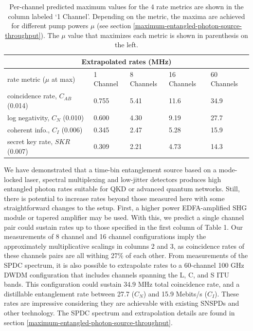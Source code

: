 \documentclass[11pt]{caltech_thesis} %
\begin{document}
\begin{table}
\begin{tabular}{ |p{3.5cm}||p{2.5cm}|p{2.5cm}|p{2.5cm}|p{2.5cm}|}
 \hline
 \multicolumn{5}{|c|}{Extrapolated rates (MHz)} \\
 \hline
 \makecell[l]{rate metric \\ ($\mu$ at max)}   &  1 Channel & 8 Channels & 16 Channels & 60 Channels \label{table:max_rates}\\
 \hline
 \makecell[l]{coincidence rate, $C_{AB}$ \\(0.014)} & 0.755 & 5.41    &  11.6  &  34.9     \\
 \hline
 \makecell[l]{log negativity, $C_N$ \\(0.010)}& 0.600 & 4.30    &  9.19  &  27.7   \\
 \hline
 \makecell[l]{coherent info., $C_I$ \\(0.006)}& 0.345 & 2.47 &  5.28  &  15.9 \\
 \hline
 \makecell[l]{secret key rate, $SKR$ \\(0.007)}& 0.309 & 2.21 &  4.73  &  14.3 \\
 \hline
\end{tabular}
\caption[{Extrapolating entanglement rates to more channels}]{Per-channel predicted maximum values for the 4 rate metrics are shown in the column labeled `1 Channel'. Depending on the metric, the maxima are achieved for different pump powers $\mu$ (see section \ref{maximum-entangled-photon-source-throughput}). The $\mu$ value that maximizes each metric is shown in parenthesis on the left.}
\label{table:maximum_rates}
\end{table}

We have demonstrated that a time-bin entanglement source based on a mode-locked laser, spectral multiplexing and low-jitter detectors produces high entangled photon rates suitable for QKD or advanced quantum networks. Still, there is potential to increase rates beyond those measured here with some straightforward changes to the setup. First, a higher power EDFA-amplified SHG module or tapered amplifier may be used. With this, we predict a single channel pair could sustain rates up to those specified in the first column of Table 1. Our measurements of 8 channel and 16 channel configurations imply the approximately multiplicative scalings in columns 2 and 3, as coincidence rates of these channels pairs are all withing 27\% of each other. From measurements of the SPDC spectrum, it is also possible to extrapolate rates to a 60-channel 100 GHz DWDM configuration that includes channels spanning the L, C, and S ITU bands. This configuration could sustain 34.9 MHz total coincidence rate, and a distillable entanglement rate between 27.7 ($C_N$) and 15.9 Mebits/s ($C_I$). These rates are impressive considering they are achievable with existing SNSPDs and other technology. The SPDC spectrum and extrapolation details are found in section \ref{maximum-entangled-photon-source-throughput}.
\end{document}
